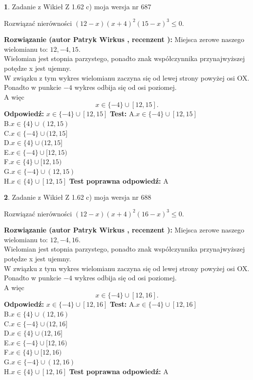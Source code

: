 \documentclass[12pt, a4paper]{article}
\theoremstyle{definition} %
\newtheorem{zad}{}
\newcommand{\zadStart}[1]{\begin{zad}#1\newline}
\newcommand{\zadStop}{\end{zad}}
\newcommand{\rozwStart}[2]{\noindent \textbf{Rozwiązanie (autor #1 , recenzent #2): }\newline}
\newcommand{\rozwStop}{\newline}
\newcommand{\odpStart}{\noindent \textbf{Odpowiedź:}\newline}
\newcommand{\odpStop}{\newline}
\newcommand{\testStart}{\noindent \textbf{Test:}\newline}
\newcommand{\testStop}{\newline}
\newcommand{\kluczStart}{\noindent \textbf{Test poprawna odpowiedź:}\newline}
\newcommand{\kluczStop}{\newline}
\begin{document}
\zadStart{Zadanie z Wikieł Z 1.62 c) moja wersja nr 687}

Rozwiązać nierówności $(12-x)(x+4)^{2}(15-x)^{3}\le0$.
\zadStop
\rozwStart{Patryk Wirkus}{}
Miejsca zerowe naszego wielomianu to: $12, -4, 15$.\\
Wielomian jest stopnia parzystego, ponadto znak współczynnika przy\linebreak najwyższej potędze x jest ujemny.\\ W związku z tym wykres wielomianu zaczyna się od lewej strony powyżej osi OX.\\
Ponadto w punkcie $-4$ wykres odbija się od osi poziomej.\\
A więc $$x \in \{-4\} \cup [12,15].$$
\rozwStop
\odpStart
$x \in \{-4\} \cup [12,15]$
\odpStop
\testStart
A.$x \in \{-4\} \cup [12,15]$\\
B.$x \in \{4\} \cup (12,15)$\\
C.$x \in \{-4\} \cup (12,15]$\\
D.$x \in \{4\} \cup (12,15]$\\
E.$x \in \{-4\} \cup [12,15)$\\
F.$x \in \{4\} \cup [12,15)$\\
G.$x \in \{-4\} \cup (12,15)$\\
H.$x \in \{4\} \cup [12,15]$
\testStop
\kluczStart
A
\kluczStop



\zadStart{Zadanie z Wikieł Z 1.62 c) moja wersja nr 688}

Rozwiązać nierówności $(12-x)(x+4)^{2}(16-x)^{3}\le0$.
\zadStop
\rozwStart{Patryk Wirkus}{}
Miejsca zerowe naszego wielomianu to: $12, -4, 16$.\\
Wielomian jest stopnia parzystego, ponadto znak współczynnika przy\linebreak najwyższej potędze x jest ujemny.\\ W związku z tym wykres wielomianu zaczyna się od lewej strony powyżej osi OX.\\
Ponadto w punkcie $-4$ wykres odbija się od osi poziomej.\\
A więc $$x \in \{-4\} \cup [12,16].$$
\rozwStop
\odpStart
$x \in \{-4\} \cup [12,16]$
\odpStop
\testStart
A.$x \in \{-4\} \cup [12,16]$\\
B.$x \in \{4\} \cup (12,16)$\\
C.$x \in \{-4\} \cup (12,16]$\\
D.$x \in \{4\} \cup (12,16]$\\
E.$x \in \{-4\} \cup [12,16)$\\
F.$x \in \{4\} \cup [12,16)$\\
G.$x \in \{-4\} \cup (12,16)$\\
H.$x \in \{4\} \cup [12,16]$
\testStop
\kluczStart
A
\kluczStop
\end{document}
